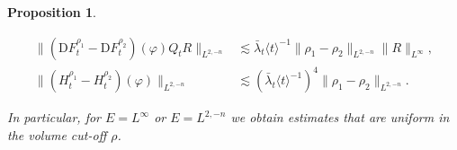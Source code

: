 \documentclass[11pt, a4paper]{scrartcl}
\numberwithin{equation}{section}
\theoremstyle{plain}
\newtheorem{proposition}[foo]{Proposition}
\theoremstyle{remark}
\newcommand{\mathD}{\mathrm{D}}
\newenvironment{enumeratealpha}{\begin{enumerate}[a{\textup{)}}] }{\end{enumerate}}
\begin{document}
\begin{proposition}
\begin{enumeratealpha}
\begin{equation}
\begin{aligned}
				\| (\mathD F^{\rho_1}_t - \mathD F_t^{\rho_2}) (\varphi) Q_t R
				\|_{L^{2, - n}}                                                & \lesssim \bar{\lambda}_t \langle t \rangle^{- 1} \|
				\rho_1 - \rho_2 \|_{L^{2, - n}}  \| R \|_{L^{\infty}},                                                               \\
				\| (H^{\rho_1}_t - H_t^{\rho_2}) (\varphi) \|_{L^{2, - n}}     & \lesssim
				(\bar{\lambda}_t \langle t \rangle^{- 1})^4 \| \rho_1 - \rho_2 \|_{L^{2, -
								n}} .
			\end{aligned} \label{eq:fe-rho-dependence}
		\end{equation}
	\end{enumeratealpha}
	In particular, for $E=L^\infty$ or $E=L^{2,-n}$ we obtain estimates that are uniform in the volume cut-off $\rho$.
\end{proposition}
\end{document}
